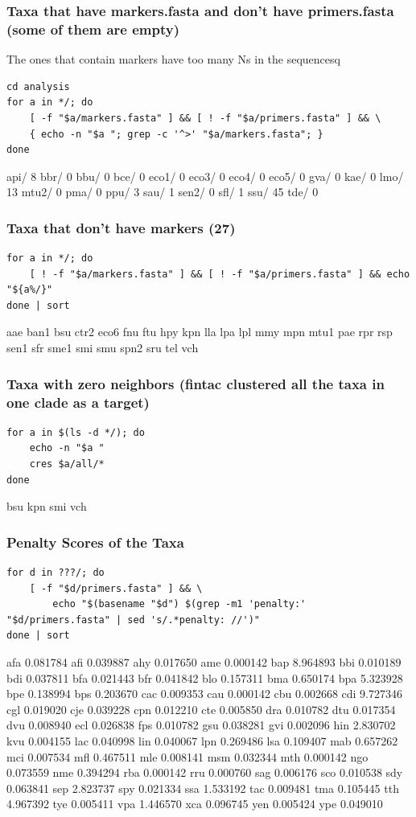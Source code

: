 \documentclass[11pt]{article}
\begin{document}
\subsubsection{Taxa that have markers.fasta and don't have primers.fasta (some of them are empty)}
\label{sec:orgd54512e}
The ones that contain markers have too many Ns in the sequencesq
\begin{verbatim}
cd analysis
for a in */; do
    [ -f "$a/markers.fasta" ] && [ ! -f "$a/primers.fasta" ] && \
    { echo -n "$a "; grep -c '^>' "$a/markers.fasta"; }
done
\end{verbatim}

api/ 8
bbr/ 0
bbu/ 0
bce/ 0
eco1/ 0
eco3/ 0
eco4/ 0
eco5/ 0
gva/ 0
kae/ 0
lmo/ 13 
mtu2/ 0
pma/ 0
ppu/ 3
sau/ 1
sen2/ 0
sfl/ 1
ssu/ 45
tde/ 0
\subsubsection{Taxa that don't have markers (27)}
\label{sec:org8366283}

\begin{verbatim}
for a in */; do
    [ ! -f "$a/markers.fasta" ] && [ ! -f "$a/primers.fasta" ] && echo "${a%/}"
done | sort
\end{verbatim}

aae
ban1
bsu
ctr2
eco6
fnu
ftu
hpy
kpn
lla
lpa
lpl
mmy
mpn
mtu1
pae
rpr
rsp
sen1
sfr
sme1
smi
smu
spn2
sru
tel
vch
\subsubsection{Taxa with zero neighbors (fintac clustered all the taxa in one clade as a target)}
\label{sec:org787baef}

\begin{verbatim}
for a in $(ls -d */); do
    echo -n "$a "
    cres $a/all/*
done
\end{verbatim}

bsu
kpn
smi
vch
\subsubsection{Penalty Scores of the Taxa}
\label{sec:org3e9a9a0}
\begin{verbatim}
for d in ???/; do
    [ -f "$d/primers.fasta" ] && \
        echo "$(basename "$d") $(grep -m1 'penalty:' "$d/primers.fasta" | sed 's/.*penalty: //')"
done | sort
\end{verbatim}

afa 0.081784  afi 0.039887
ahy 0.017650  ame 0.000142
bap 8.964893  bbi 0.010189
bdi 0.037811  bfa 0.021443
bfr 0.041842  blo 0.157311
bma 0.650174  bpa 5.323928
bpe 0.138994  bps 0.203670
cac 0.009353  cau 0.000142
cbu 0.002668  cdi 9.727346
cgl 0.019020  cje 0.039228
cpn 0.012210  cte 0.005850
dra 0.010782  dtu 0.017354
dvu 0.008940  ecl 0.026838
fps 0.010782  gsu 0.038281
gvi 0.002096  hin 2.830702
kvu 0.004155  lac 0.040998
lin 0.040067  lpn 0.269486
lsa 0.109407  mab 0.657262
mci 0.007534  mfl 0.467511
mle 0.008141  msm 0.032344
mth 0.000142  ngo 0.073559
nme 0.394294  rba 0.000142
rru 0.000760  sag 0.006176
sco 0.010538  sdy 0.063841
sep 2.823737  spy 0.021334
ssa 1.533192  tac 0.009481
tma 0.105445  tth 4.967392
tye 0.005411  vpa 1.446570
xca 0.096745  yen 0.005424
ype 0.049010
\end{document}
